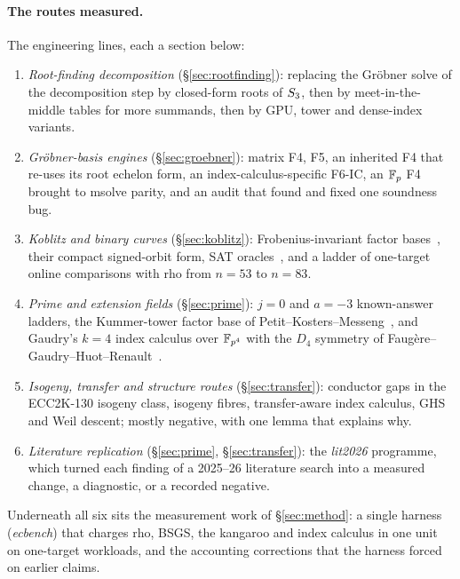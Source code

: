\paragraph{The routes measured.} The engineering lines, each a section below:
\begin{enumerate}
\item \emph{Root-finding decomposition} (\S\ref{sec:rootfinding}):
  replacing the Gr\"obner solve of the decomposition step by closed-form
  roots of $S_{3}$, then by meet-in-the-middle tables for more summands,
  then by GPU, tower and dense-index variants.
\item \emph{Gr\"obner-basis engines} (\S\ref{sec:groebner}): matrix F4,
  F5, an inherited F4 that re-uses its root echelon form, an
  index-calculus-specific F6-IC, an $\mathbb{F}_p$ F4 brought to msolve parity,
  and an audit that found and fixed one soundness bug.
\item \emph{Koblitz and binary curves} (\S\ref{sec:koblitz}):
  Frobenius-invariant factor bases~\cite{ggmp2020}, their compact
  signed-orbit form, SAT oracles~\cite{trimoska2020}, and a ladder of
  one-target online comparisons with rho from $n=53$ to $n=83$.
\item \emph{Prime and extension fields} (\S\ref{sec:prime}): $j=0$ and
  $a=-3$ known-answer ladders, the Kummer-tower factor base of
  Petit--Kosters--Messeng~\cite{pkm2016}, and Gaudry's $k=4$ index
  calculus over $\mathbb{F}_{p^4}$ with the $D_4$ symmetry of
  Faug\`ere--Gaudry--Huot--Renault~\cite{fghr2014}.
\item \emph{Isogeny, transfer and structure routes}
  (\S\ref{sec:transfer}): conductor gaps in the ECC2K-130 isogeny class,
  isogeny fibres, transfer-aware index calculus, GHS and Weil descent;
  mostly negative, with one lemma that explains why.
\item \emph{Literature replication} (\S\ref{sec:prime},
  \S\ref{sec:transfer}): the \emph{lit2026} programme, which turned each
  finding of a 2025--26 literature search into a measured change, a
  diagnostic, or a recorded negative.
\end{enumerate}
Underneath all six sits the measurement work of \S\ref{sec:method}: a
single harness (\emph{ecbench}) that charges rho, BSGS, the kangaroo and
index calculus in one unit on one-target workloads, and the accounting
corrections that the harness forced on earlier claims.

